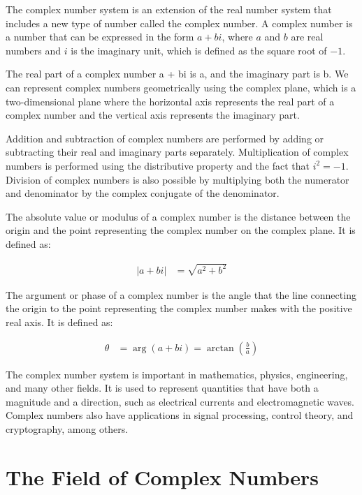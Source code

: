\documentclass[12pt,openany]{book}
\theoremstyle{definition}
\begin{document}
	The complex number system is an extension of the real number system that includes a new type of number called the complex number. A complex number is a number that can be expressed in the form $a + bi$, where $a$ and $b$ are real numbers and $i$ is the imaginary unit, which is defined as the square root of $-1$.
	
	The real part of a complex number a + bi is a, and the imaginary part is b. We can represent complex numbers geometrically using the complex plane, which is a two-dimensional plane where the horizontal axis represents the real part of a complex number and the vertical axis represents the imaginary part.
	
	Addition and subtraction of complex numbers are performed by adding or subtracting their real and imaginary parts separately. Multiplication of complex numbers is performed using the distributive property and the fact that $i^2 = -1$. Division of complex numbers is also possible by multiplying both the numerator and denominator by the complex conjugate of the denominator.
	
	The absolute value or modulus of a complex number is the distance between the origin and the point representing the complex number on the complex plane. It is defined as:
	
	\begin{align*}
	|a+bi| &= \sqrt{a^2 + b^2}
	\end{align*}
	
	The argument or phase of a complex number is the angle that the line connecting the origin to the point representing the complex number makes with the positive real axis. It is defined as:
	
	\begin{align*}
	\theta &= \operatorname{arg}(a+bi) = \operatorname{arctan}\left(\frac{b}{a}\right)
	\end{align*}
	
	The complex number system is important in mathematics, physics, engineering, and many other fields. It is used to represent quantities that have both a magnitude and a direction, such as electrical currents and electromagnetic waves. Complex numbers also have applications in signal processing, control theory, and cryptography, among others.
	
	\newpage
	\section{The Field of Complex Numbers}
	
\end{document}
